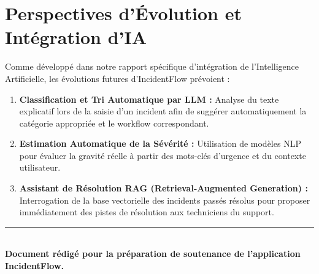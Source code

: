 \documentclass[12pt,a4paper]{article}
\begin{document}
\clearpage

\section{Perspectives d'Évolution et Intégration d'IA}

Comme développé dans notre rapport spécifique d'intégration de l'Intelligence Artificielle, les évolutions futures d'IncidentFlow prévoient :

\begin{enumerate}
    \item \textbf{Classification et Tri Automatique par LLM :} Analyse du texte explicatif lors de la saisie d'un incident afin de suggérer automatiquement la catégorie appropriée et le workflow correspondant.
    \item \textbf{Estimation Automatique de la Sévérité :} Utilisation de modèles NLP pour évaluer la gravité réelle à partir des mots-clés d'urgence et du contexte utilisateur.
    \item \textbf{Assistant de Résolution RAG (Retrieval-Augmented Generation) :} Interrogation de la base vectorielle des incidents passés résolus pour proposer immédiatement des pistes de résolution aux techniciens du support.
\end{enumerate}

\vspace{1.5cm}
\begin{center}
    \textcolor{secondary}{\rule{0.6\textwidth}{1pt}}\\[0.5cm]
    \textcolor{primary}{\textbf{Document rédigé pour la préparation de soutenance de l'application IncidentFlow.}}
\end{center}
\end{document}

